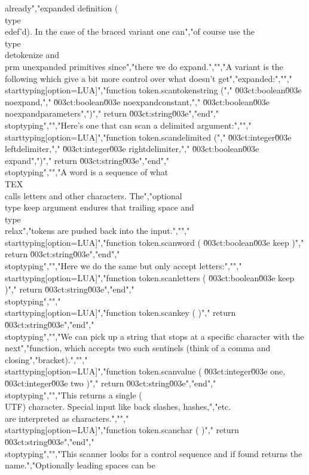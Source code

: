 already","expanded definition (\\type {\\edef}'d). In the case of the braced variant one can","of course use the \\type {\\detokenize} and \\prm {unexpanded} primitives since","there we do expand.","","A variant is the following which give a bit more control over what doesn't get","expanded:","","\\starttyping[option=LUA]","function token.scantokenstring (","    \u003ct:boolean\u003e noexpand,","    \u003ct:boolean\u003e noexpandconstant,","    \u003ct:boolean\u003e noexpandparameters",")","    return \u003ct:string\u003e","end","\\stoptyping","","Here's one that can scan a delimited argument:","","\\starttyping[option=LUA]","function token.scandelimited (","    \u003ct:integer\u003e leftdelimiter,","    \u003ct:integer\u003e rightdelimiter,","    \u003ct:boolean\u003e expand",")","    return \u003ct:string\u003e","end","\\stoptyping","","A word is a sequence of what \\TEX\\ calls letters and other characters. The","optional \\type {keep} argument endures that trailing space and \\type {\\relax}","tokens are pushed back into the input.","","\\starttyping[option=LUA]","function token.scanword ( \u003ct:boolean\u003e keep )","    return \u003ct:string\u003e","end","\\stoptyping","","Here we do the same but only accept letters:","","\\starttyping[option=LUA]","function token.scanletters ( \u003ct:boolean\u003e keep )","    return \u003ct:string\u003e","end","\\stoptyping","","\\starttyping[option=LUA]","function token.scankey ( )","    return \u003ct:string\u003e","end","\\stoptyping","","We can pick up a string that stops at a specific character with the next","function, which accepts two such sentinels (think of a comma and closing","bracket).","","\\starttyping[option=LUA]","function token.scanvalue ( \u003ct:integer\u003e one, \u003ct:integer\u003e two )","    return \u003ct:string\u003e","end","\\stoptyping","","This returns a single (\\UTF) character. Special input like back slashes, hashes,","etc.\\ are interpreted as characters.","","\\starttyping[option=LUA]","function token.scanchar ( )","    return \u003ct:string\u003e","end","\\stoptyping","","This scanner looks for a control sequence and if found returns the name.","Optionally leading spaces can be 